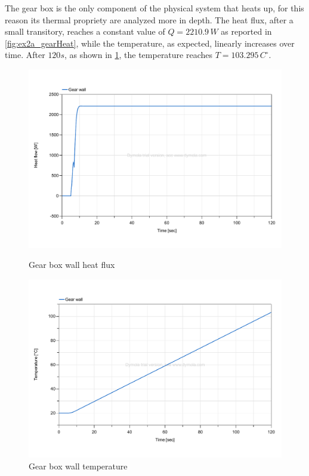\documentclass[11pt,a4paper,oneside]{article}
\begin{document}
The gear box is the only component of the physical system that heats up, for this reason its thermal propriety are analyzed more in depth.   
The heat flux, after a small transitory, reaches a constant value of $Q=2210.9\,W$ as reported in \cref{fig:ex2a_gearHeat}, while the temperature, as expected, linearly increases over time.
After $120s$, as shown in \cref{fig:ex2a_gearTemp}, the temperature reaches $T=103.295\,C^{\circ}$.
\begin{figure}[H]
    \centering
    \begin{minipage}{0.45\textwidth}
        \centering
        \includegraphics*[width=\textwidth, keepaspectratio]{Figures/ex2a_gearHeat.pdf}
        \caption[]{\label{fig:ex2a_gearHeat} Gear box wall heat flux}
    \end{minipage}
    \hspace{0.05\textwidth}
    \begin{minipage}{0.45\textwidth}
        \centering
        \includegraphics*[width=\textwidth, keepaspectratio]{Figures/ex2a_gearTemp.pdf}
        \caption[]{\label{fig:ex2a_gearTemp} Gear box wall temperature}
    \end{minipage}
\end{figure}
\end{document}
